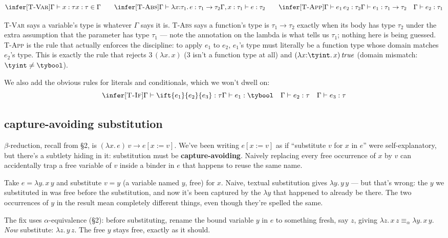 \[
\infer[\textsc{T-Var}]
  {\Gamma \vdash x : \tau}
  {x : \tau \in \Gamma}
\qquad
\infer[\textsc{T-Abs}]
  {\Gamma \vdash \lambda x{:}\tau_1.\, e : \tau_1 \to \tau_2}
  {\Gamma, x : \tau_1 \vdash e : \tau_2}
\qquad
\infer[\textsc{T-App}]
  {\Gamma \vdash e_1\, e_2 : \tau_2}
  {\Gamma \vdash e_1 : \tau_1 \to \tau_2 \quad \Gamma \vdash e_2 : \tau_1}
\]

\textsc{T-Var} says a variable's type is whatever $\Gamma$ says it is. \textsc{T-Abs} says a function's type is $\tau_1 \to \tau_2$ exactly when its body has type $\tau_2$ under the extra assumption that the parameter has type $\tau_1$ — note the annotation on the lambda is what tells us $\tau_1$; nothing here is being guessed. \textsc{T-App} is the rule that actually enforces the discipline: to apply $e_1$ to $e_2$, $e_1$'s type must literally be a function type whose domain matches $e_2$'s type. This is exactly the rule that rejects $3\,(\lambda x.\,x)$ ($3$ isn't a function type at all) and $(\lambda x{:}\tyint.\,x)\,\mathit{true}$ (domain mismatch: $\tyint \neq \tybool$).

We also add the obvious rules for literals and conditionals, which we won't dwell on:
\[
\infer[\textsc{T-If}]
  {\Gamma \vdash \ift{e_1}{e_2}{e_3} : \tau}
  {\Gamma \vdash e_1 : \tybool \quad \Gamma \vdash e_2 : \tau \quad \Gamma \vdash e_3 : \tau}
\]

\subsection{capture-avoiding substitution}

$\beta$-reduction, recall from \S2, is $(\lambda x.\,e)\,v \to e[x := v]$. We've been writing $e[x := v]$ as if ``substitute $v$ for $x$ in $e$'' were self-explanatory, but there's a subtlety hiding in it: substitution must be \textbf{capture-avoiding}. Naively replacing every free occurrence of $x$ by $v$ can accidentally trap a free variable of $v$ inside a binder in $e$ that happens to reuse the same name.

\begin{example}
Take $e = \lambda y.\, x\, y$ and substitute $v = y$ (a variable named $y$, free) for $x$. Naive, textual substitution gives $\lambda y.\, y\, y$ — but that's wrong: the $y$ we substituted in was free before the substitution, and now it's been captured by the $\lambda y$ that happened to already be there. The two occurrences of $y$ in the result mean completely different things, even though they're spelled the same.

The fix uses $\alpha$-equivalence (\S2): before substituting, rename the bound variable $y$ in $e$ to something fresh, say $z$, giving $\lambda z.\, x\, z \equiv_\alpha \lambda y.\, x\, y$. \emph{Now} substitute: $\lambda z.\, y\, z$. The free $y$ stays free, exactly as it should.
\end{example}

